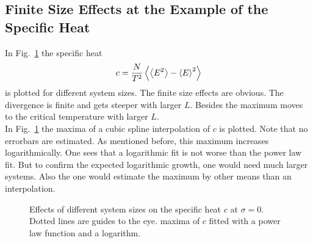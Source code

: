 \subsection{Finite Size Effects at the Example of the Specific Heat}
\label{appendix:finiteSizeEffects}
    In Fig.\ \ref{fig:smeared_out_appendix} the specific heat
    \begin{equation}
        c = \frac{N}{T^2}\left< \left< E^2 \right> - \left< E \right>^2 \right>
    \end{equation}
    is plotted for different system sizes. The finite size effects are obvious.
    The divergence is finite and gets steeper with larger \(L\). Besides
    the maximum moves to the critical temperature with larger \(L\).\\
    In Fig.\ \ref{fig:smeared_out_appendix} the maxima of a
    cubic spline interpolation of \(c\) is plotted. Note that no errorbars
    are estimated. As mentioned before,
    this maximum increases logarithmically. One sees that a logarithmic
    fit is not worse than the power law fit. But to confirm the expected
    logarithmic growth, one would need much larger systems. Also the one
    would estimate the maximum by other means than an interpolation.
    \begin{figure}[htbp]
        \centering
        \caption[Finite Size Effects by Example of the Specific Heat]
        {
             Effects of different system sizes on the specific heat \(c\)
            at \(\sigma = 0\). Dotted lines are guides to the eye.
             maxima of \(c\) fitted
            with a power law function and a logarithm.
        }
        \label{fig:smeared_out_appendix}
    \end{figure}
